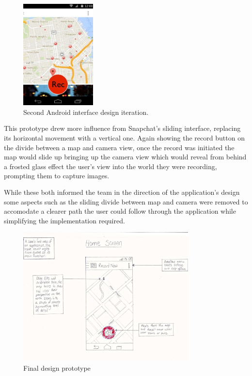 \documentclass{l3proj}
\begin{document}
\begin{figure}[ht!]
\centering
\includegraphics[width=0.34\textwidth]{images/android-digital-prototype-2.jpg}
\caption{Second Android interface design iteration.}
\end{figure}

This prototype drew more influence from Snapchat’s sliding interface, replacing
its horizontal movement with a vertical one. Again showing the record button on
the divide between a map and camera view, once the record was initiated the map
would slide up bringing up the camera view which would reveal from behind a
frosted glass effect the user's view into the world they were recording,
prompting them to capture images.

While these both informed the team in the direction of the application's design some aspects such as the sliding divide between map and camera were removed to accomodate a clearer path the user could follow through the application while simplifying the implementation required.

\begin{figure}[ht!]
\centering
\includegraphics[width=90mm]{images/android-home-view.jpg}
\caption{Final design prototype}
\label{overflow}
\end{figure}
\end{document}

